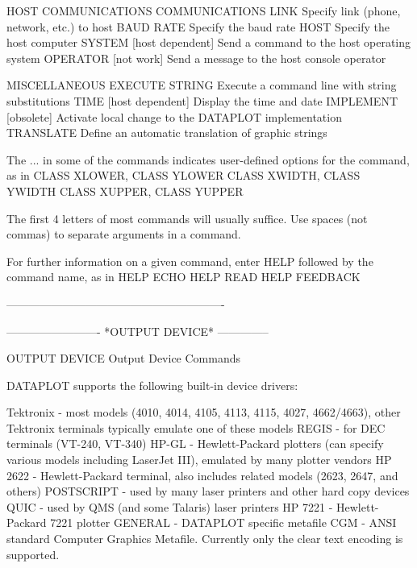 HOST COMMUNICATIONS
   COMMUNICATIONS LINK     Specify link (phone, network, etc.) to host
   BAUD RATE               Specify the baud rate
   HOST                    Specify the host computer
   SYSTEM [host dependent] Send a command to the host operating system
   OPERATOR     [not work] Send a message to the host console operator
 
MISCELLANEOUS
   EXECUTE STRING          Execute a command line with string
                           substitutions
   TIME   [host dependent] Display the time and date
   IMPLEMENT [obsolete]    Activate local change to the DATAPLOT
                           implementation
   TRANSLATE               Define an automatic translation of graphic
                           strings
 
The ... in some of the commands indicates user-defined options for
the command, as in
   CLASS XLOWER, CLASS YLOWER
   CLASS XWIDTH, CLASS YWIDTH
   CLASS XUPPER, CLASS YUPPER
 
The first 4 letters of most commands will usually suffice.  Use spaces
(not commas) to separate arguments in a command.
 
For further information on a given command, enter HELP   followed by
the command name, as in
   HELP ECHO
   HELP READ
   HELP FEEDBACK
 
----------------------------------------------------------
 
 
 
 
 
 
 
 
 
 
 
 
 
 
 
 
 
 
 
 
 
 
 
 
-------------------------  *OUTPUT DEVICE*  --------------
 
OUTPUT DEVICE
Output Device Commands
 
DATAPLOT supports the following built-in device drivers:
 
    Tektronix     - most models (4010, 4014, 4105, 4113, 4115, 4027,
                    4662/4663), other Tektronix terminals typically
                    emulate one of these models
    REGIS         - for DEC terminals (VT-240, VT-340)
    HP-GL         - Hewlett-Packard plotters (can specify various
                    models including LaserJet III), emulated by many
                    plotter vendors
    HP 2622       - Hewlett-Packard terminal, also includes related
                    models (2623, 2647, and others)
    POSTSCRIPT    - used by many laser printers and other hard copy
                    devices
    QUIC          - used by QMS (and some Talaris) laser printers
    HP 7221       - Hewlett-Packard 7221 plotter
    GENERAL       - DATAPLOT specific metafile
    CGM           - ANSI standard Computer Graphics Metafile.
                    Currently only the clear text encoding is
                    supported.
 
